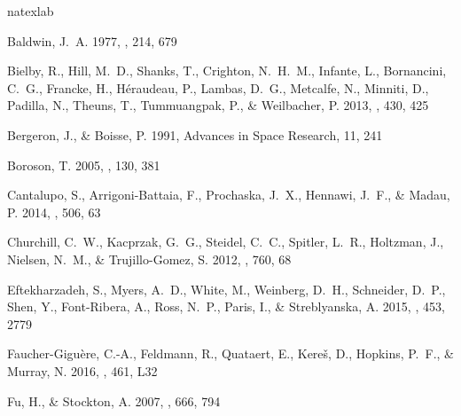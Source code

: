 \documentclass[iop]{emulateapj}
\begin{document}
\begin{thebibliography}{54}
\expandafter\ifx\csname natexlab\endcsname\relax\def\natexlab#1{#1}\fi

{Baldwin}, J.~A. 1977, \apj, 214, 679

{Bielby}, R., {Hill}, M.~D., {Shanks}, T., {Crighton}, N.~H.~M., {Infante}, L.,
  {Bornancini}, C.~G., {Francke}, H., {H{\'e}raudeau}, P., {Lambas}, D.~G.,
  {Metcalfe}, N., {Minniti}, D., {Padilla}, N., {Theuns}, T., {Tummuangpak},
  P., \& {Weilbacher}, P. 2013, \mnras, 430, 425

{Bergeron}, J., \& {Boisse}, P. 1991, Advances in Space Research, 11, 241

{Boroson}, T. 2005, \aj, 130, 381

{Cantalupo}, S., {Arrigoni-Battaia}, F., {Prochaska}, J.~X., {Hennawi}, J.~F.,
  \& {Madau}, P. 2014, \nat, 506, 63

{Churchill}, C.~W., {Kacprzak}, G.~G., {Steidel}, C.~C., {Spitler}, L.~R.,
  {Holtzman}, J., {Nielsen}, N.~M., \& {Trujillo-Gomez}, S. 2012, \apj, 760, 68

{Eftekharzadeh}, S., {Myers}, A.~D., {White}, M., {Weinberg}, D.~H.,
  {Schneider}, D.~P., {Shen}, Y., {Font-Ribera}, A., {Ross}, N.~P., {Paris},
  I., \& {Streblyanska}, A. 2015, \mnras, 453, 2779

{Faucher-Gigu{\`e}re}, C.-A., {Feldmann}, R., {Quataert}, E., {Kere{\v s}}, D.,
  {Hopkins}, P.~F., \& {Murray}, N. 2016, \mnras, 461, L32

{Fu}, H., \& {Stockton}, A. 2007, \apj, 666, 794


\end{thebibliography}
\end{document}
